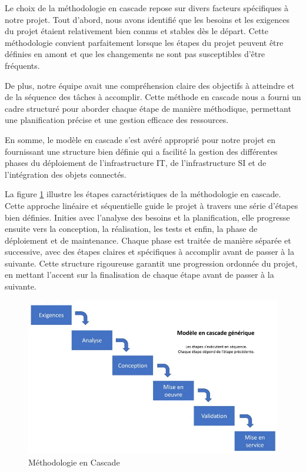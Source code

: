 Le choix de la méthodologie en cascade repose sur divers facteurs spécifiques à notre projet. Tout d'abord, nous avons identifié que les besoins et les exigences du projet étaient relativement bien connus et stables dès le départ. Cette méthodologie convient parfaitement lorsque les étapes du projet peuvent être définies en amont et que les changements ne sont pas susceptibles d'être fréquents.

De plus, notre équipe avait une compréhension claire des objectifs à atteindre et de la séquence des tâches à accomplir. Cette méthode en cascade nous a fourni un cadre structuré pour aborder chaque étape de manière méthodique, permettant une planification précise et une gestion efficace des ressources. 

En somme, le modèle en cascade s'est avéré approprié pour notre projet en fournissant une structure bien définie qui a facilité la gestion des différentes phases du déploiement de l'infrastructure IT, de l'infrastructure SI et de l'intégration des objets connectés.


La figure \ref{Chap1.4} illustre les étapes caractéristiques de la méthodologie en cascade. Cette approche linéaire  et séquentielle guide le projet à travers une série d'étapes bien définies. Inities avec l'analyse des besoins et la planification, elle progresse ensuite vers la conception, la réalisation, les tests et enfin, la phase de déploiement et de maintenance. Chaque phase est traitée de manière séparée et successive, avec des étapes claires et spécifiques à accomplir avant de passer à la suivante. Cette structure rigoureuse garantit une progression ordonnée du projet, en mettant l'accent sur la finalisation de chaque étape avant de passer à la suivante.


\begin{figure}[H]
 \centering
    \includegraphics[width=15cm]{Images/cascade1.png}
    \caption{Méthodologie en Cascade \cite{blogcascade}}
    \label{Chap1.4}
\end{figure}


